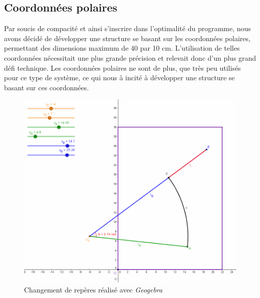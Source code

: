 \documentclass[12pt,a4paper]{report}
\begin{document}
\subsection*{Coordonnées polaires}
Par soucis de compacité et ainsi s'inscrire dans l'optimalité du programme, nous avons décidé de développer une structure se basant sur les coordonnées polaires, permettant des dimensions maximum de 40 par 10 cm. L'utilisation de telles coordonnées nécessitait une plus grande précision et relevait donc d'un plus grand défi technique. Les coordonnées polaires ne sont de plus, que très peu utilisés pour ce type de système, ce qui nous à incité à développer une structure se basant sur ces coordonnées.
\begin{figure}[!h]
 \center
 \includegraphics[scale=0.5]{../pictures/Changement_repere}
 \caption{Changement de repères réalisé avec \emph{Geogebra}}
\end{figure}
\end{document}

